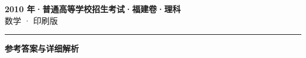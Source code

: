 \documentclass[zihao=5, a4paper]{ctexart}
\begin{document}
\begin{center}
  {\Large\bfseries 2010 年·普通高等学校招生考试·福建卷·理科}\\[4pt]
  {\large 数学 · 印刷版}
\end{center}
\medskip
{}

\par\bigskip\hrule\bigskip
{}
\begin{center}{\large\bfseries 参考答案与详细解析}\end{center}
\smallskip

\end{document}
